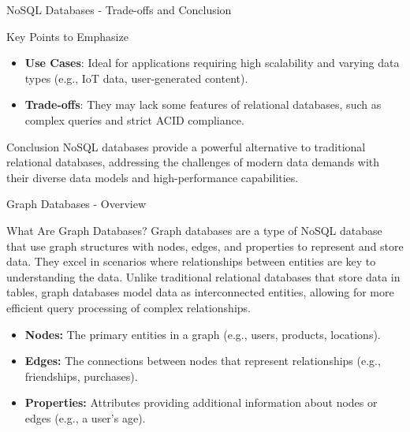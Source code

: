 \documentclass[aspectratio=169]{beamer}
\begin{document}
\begin{frame}[fragile]{NoSQL Databases - Trade-offs and Conclusion}
    \begin{block}{Key Points to Emphasize}
        \begin{itemize}
            \item \textbf{Use Cases}: Ideal for applications requiring high scalability and varying data types (e.g., IoT data, user-generated content).
            \item \textbf{Trade-offs}: They may lack some features of relational databases, such as complex queries and strict ACID compliance.
        \end{itemize}
    \end{block}

    \begin{block}{Conclusion}
        NoSQL databases provide a powerful alternative to traditional relational databases, addressing the challenges of modern data demands with their diverse data models and high-performance capabilities.
    \end{block}
\end{frame}

\begin{frame}[fragile]{Graph Databases - Overview}
    \begin{block}{What Are Graph Databases?}
        Graph databases are a type of NoSQL database that use graph structures with nodes, edges, and properties to represent and store data.
        They excel in scenarios where relationships between entities are key to understanding the data. 
        Unlike traditional relational databases that store data in tables, graph databases model data as interconnected entities, allowing for more efficient query processing of complex relationships.
    \end{block}
    
    \begin{itemize}
        \item \textbf{Nodes:} The primary entities in a graph (e.g., users, products, locations).
        \item \textbf{Edges:} The connections between nodes that represent relationships (e.g., friendships, purchases).
        \item \textbf{Properties:} Attributes providing additional information about nodes or edges (e.g., a user's age).
    \end{itemize}
\end{frame}
\end{document}
